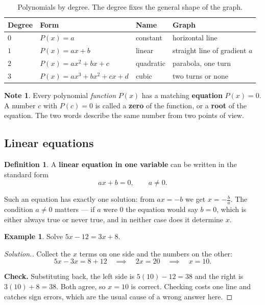 \documentclass[11pt,a4paper]{article}
\theoremstyle{definition}
\newtheorem{definition}[thm]{Definition}
\newtheorem{example}[thm]{Example}
\newtheorem{note}[thm]{Note}
\newenvironment{solution}
  {\renewcommand{\qedsymbol}{}\begin{proof}[\textit{Solution}.]}
  {\end{proof}}
\begin{document}
\begin{table}[H]
\centering
\begin{tabular}{|l|l|l|l|}
\hline
Degree & Form & Name & Graph\\
\hline
$0$ & $P(x)=a$ & constant & horizontal line\\
$1$ & $P(x)=ax+b$ & linear & straight line of gradient $a$\\
$2$ & $P(x)=ax^2+bx+c$ & quadratic & parabola, one turn\\
$3$ & $P(x)=ax^3+bx^2+cx+d$ & cubic & two turns or none\\
\hline
\end{tabular}
\caption{Polynomials by degree. The degree fixes the general shape of the graph.}
\end{table}

\begin{note}
Every polynomial \emph{function} $P(x)$ has a matching \textbf{equation} $P(x)=0$. A
number $c$ with $P(c)=0$ is called a \textbf{zero} of the function, or a \textbf{root}
of the equation. The two words describe the same number from two points of view.
\end{note}

\subsection{Linear equations}

\begin{definition}
A \textbf{linear equation in one variable} can be written in the standard form
$$ax+b=0,\qquad a\neq 0.$$
\end{definition}

Such an equation has exactly one solution: from $ax=-b$ we get $x=-\frac{b}{a}$. The
condition $a\neq 0$ matters --- if $a$ were $0$ the equation would say $b=0$, which is
either always true or never true, and in neither case does it determine $x$.

\begin{example}
Solve $5x-12=3x+8$.
\end{example}

\begin{solution}
Collect the $x$ terms on one side and the numbers on the other:
$$5x-3x=8+12\quad\implies\quad 2x=20\quad\implies\quad x=10.$$

\textbf{Check.} Substituting back, the left side is $5(10)-12=38$ and the right is
$3(10)+8=38$. Both agree, so $x=10$ is correct. Checking costs one line and catches
sign errors, which are the usual cause of a wrong answer here.
\end{solution}
\end{document}
